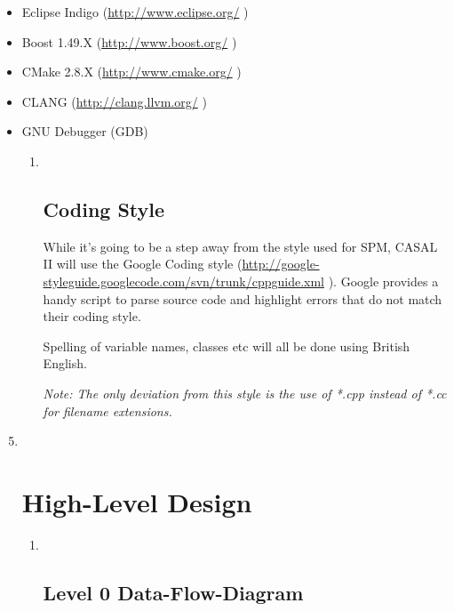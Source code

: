 \documentclass[a4paper,11pt,twoside,pdftex,draft]{article}
\begin{document}
\begin{itemize}
\item
  Eclipse Indigo
  (\href{http://www.eclipse.org/}{{http://www.eclipse.org/}} )
\item
  Boost 1.49.X (\href{http://www.boost.org/}{{http://www.boost.org/}} )
\item
  CMake 2.8.X (\href{http://www.cmake.org/}{{http://www.cmake.org/}} )
\item
  CLANG (\href{http://clang.llvm.org/}{{http://clang.llvm.org/}} )
\item
  GNU Debugger (GDB)

  \begin{enumerate}
  \item ~
    \hypertarget{coding-style}{%
    \subsection{Coding Style}\label{coding-style}}

    While it's going to be a step away from the style used for SPM,
    CASAL II will use the Google Coding style
    (\href{http://google-styleguide.googlecode.com/svn/trunk/cppguide.xml}{{http://google-styleguide.googlecode.com/svn/trunk/cppguide.xml}}
    ). Google provides a handy script to parse source code and highlight
    errors that do not match their coding style.

    Spelling of variable names, classes etc will all be done using
    British English.

    \emph{Note: The only deviation from this style is the use of *.cpp
    instead of *.cc for filename extensions.}
  \end{enumerate}
\end{itemize}

\begin{enumerate}
\setcounter{enumi}{4}
\item ~
  \hypertarget{high-level-design}{%
  \section{\texorpdfstring{\textbf{High-Level
  Design}}{High-Level Design}}\label{high-level-design}}

  \begin{enumerate}
  \item ~
    \hypertarget{level-0-data-flow-diagram}{%
    \subsection{Level 0
    Data-Flow-Diagram}\label{level-0-data-flow-diagram}}
  \end{enumerate}
\end{enumerate}
\end{document}
